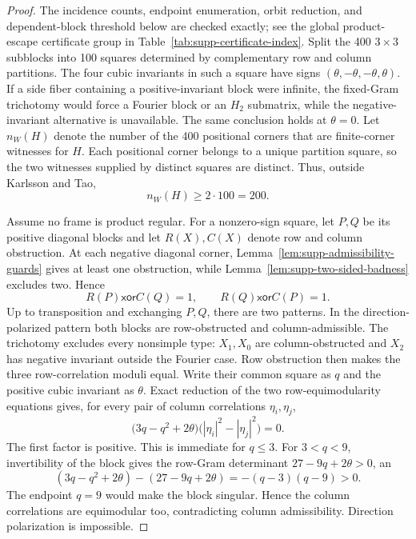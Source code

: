 \documentclass[aps,prx,reprint,nofootinbib,twoside,superscriptaddress,longbibliography,floatfix]{revtex4-2}
\theoremstyle{definition}
\begin{document}
\begin{proof}
The incidence counts, endpoint enumeration, orbit reduction, and dependent-block threshold below are checked exactly; see the global product-escape certificate group in Table~\ref{tab:supp-certificate-index}.
Split the 400 $3\times3$ subblocks into 100 squares determined by complementary row and column partitions.  The four cubic invariants in such a square have signs $(\theta,-\theta,-\theta,\theta)$.  If a side fiber containing a positive-invariant block were infinite, the fixed-Gram trichotomy would force a Fourier block or an $H_2$ submatrix, while the negative-invariant alternative is unavailable. The same conclusion holds at $\theta=0$. Let $n_W(H)$ denote the number of the 400 positional corners that are finite-corner witnesses for $H$. Each positional corner belongs to a unique partition square, so the two witnesses supplied by distinct squares are distinct. Thus, outside Karlsson and Tao,
\begin{equation}
n_W(H)\ge 2\cdot100=200.
\label{eq:supp-witness-multiplicity}
\end{equation}

{Assume no frame is product regular.  For a nonzero-sign square, let $P,Q$ be its positive diagonal blocks and let $R(X),C(X)$ denote row and column obstruction.  At each negative diagonal corner, Lemma~\ref{lem:supp-admissibility-guards} gives at least one obstruction, while Lemma~\ref{lem:supp-two-sided-badness} excludes two. Hence}
\begin{equation}
R(P)\mathbin{\mathsf{xor}}C(Q)=1,
\qquad
R(Q)\mathbin{\mathsf{xor}}C(P)=1.
\label{eq:supp-badness-xor}
\end{equation}
Up to transposition and exchanging $P,Q$, there are two patterns.  In the direction-polarized pattern both blocks are {row-obstructed and column-admissible}.  {The trichotomy excludes every nonsimple type: $X_1,X_0$ are column-obstructed and $X_2$ has negative invariant outside the Fourier case.}  {Row obstruction} then makes the three row-correlation moduli equal. Write their common square as $q$ and the positive cubic invariant as $\theta$. Exact reduction of the two row-equimodularity equations gives, for every pair of column correlations $\eta_i,\eta_j$,
\begin{equation}
\bigl(3q-q^2+2\theta\bigr)
\bigl(|\eta_i|^2-|\eta_j|^2\bigr)=0.
\label{eq:supp-direction-polarization}
\end{equation}
The first factor is positive. This is immediate for $q\leq3$. For $3<q<9$, invertibility of the block gives the row-Gram determinant $27-9q+2\theta>0$, an
\begin{equation}
(3q-q^2+2\theta)-(27-9q+2\theta)=-(q-3)(q-9)>0.
\end{equation}
The endpoint $q=9$ would make the block singular. Hence the column correlations are equimodular too, contradicting column admissibility. Direction polarization is impossible.


\end{proof}
\end{document}
